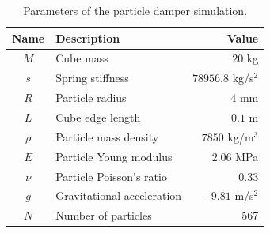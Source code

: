 \documentclass[a4paper,12pt,openany]{book}
\theoremstyle{break}
\begin{document}
\begin{table}[h!]
\begin{center}
\caption{Parameters of the particle damper simulation.}\label{tbl:particle_damper_values}
\begin{tabular}{ c l r } 
\toprule[1.5pt]
\bf Name & \bf Description & \bf Value \\
\midrule
$M$ & Cube mass & $20$ kg \\
$s$ & Spring stiffness & $78956.8$ kg/s$^2$ \\
$R$ & Particle radius & $4$ mm \\
$L$ & Cube edge length & $0.1$ m \\
$\rho$ & Particle mass density & $7850$ kg/m$^3$ \\
$E$ & Particle Young modulus & $2.06$ MPa \\
$\nu$ & Particle Poisson's ratio & $0.33$ \\
$g$ & Gravitational acceleration & $-9.81$ m/s${^2}$ \\
$N$ & Number of particles & 567 \\
\bottomrule[1.25pt]
\end{tabular}
\end{center}
\end{table}
\end{document}
